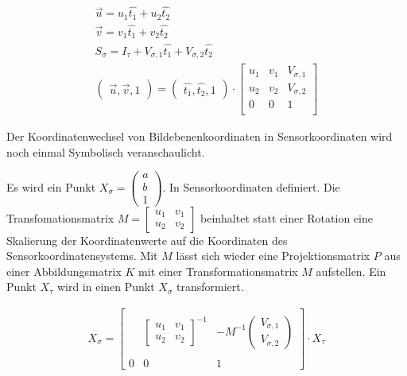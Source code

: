 		\begin{gather}
		\vec{u} = u_1 \hat{t_1} + u_2 \hat{t_2}\\
		\vec{v} = v_1 \hat{t_1} + v_2 \hat{t_2}\\
		S_\sigma = I_\tau +V_{\sigma,1} \hat{t_1} + V_{\sigma,2} \hat{t_2}\\
		\begin{pmatrix}
		\vec{u}, \vec{v}, 1
		\end{pmatrix}		
		=
		\begin{pmatrix}
		\hat{t_1}, \hat{t_2}, 1
		\end{pmatrix}\cdot	
		\begin{bmatrix}
		u_1&v_1&V_{\sigma,1}\\u_2&v_2&V_{\sigma,2}\\0&0&1\\
		\end{bmatrix}
		\end{gather}
		
		Der Koordinatenwechsel von Bildebenenkoordinaten in Sensorkoordinaten wird noch einmal Symbolisch veranschaulicht.	 
		
		Es wird ein Punkt $X_\sigma=\begin{pmatrix}
		a\\b\\1
		\end{pmatrix}$. In Sensorkoordinaten definiert. Die Transfomationsmatrix $M = \begin{bmatrix}
	u_1& v_1\\
	u_2& v_2
\end{bmatrix}$ beinhaltet statt einer Rotation eine Skalierung der Koordinatenwerte auf die Koordinaten des Sensorkoordinatensystems. Mit $M$ lässt sich wieder eine Projektionsmatrix $P$ aus einer Abbildungsmatrix $K$ mit einer Transformationsmatrix $M$ aufstellen. Ein Punkt $X_\tau$ wird in einen Punkt $X_\sigma$ transformiert.
	
		\begin{gather}
		X_\sigma =
		\begin{bmatrix}
		&  & \\
		&\begin{bmatrix}
		u_1& v_1\\
		u_2& v_2
		\end{bmatrix}^{-1}  & -M^{-1}\begin{pmatrix}
		V_{\sigma,1}\\V_{\sigma,2}
		\end{pmatrix} \\ 
		&  & \\
		0&0 & 1
		\end{bmatrix}
		\cdot
		X_\tau	
		\end{gather}\\
		
